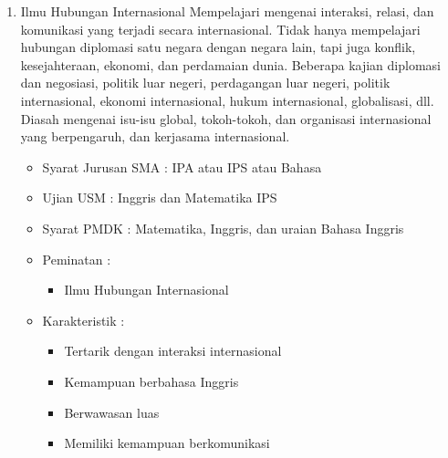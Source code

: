 \documentclass[a4paper,twoside]{article}
\begin{document}
\begin{enumerate}
\begin{enumerate}
\begin{enumerate}
				\item Ilmu Hubungan Internasional
					Mempelajari mengenai interaksi, relasi, dan komunikasi yang terjadi secara internasional. Tidak hanya mempelajari hubungan diplomasi satu negara dengan negara lain, tapi juga konflik, kesejahteraan, ekonomi, dan perdamaian dunia. Beberapa kajian diplomasi dan negosiasi, politik luar negeri, perdagangan luar negeri, politik internasional, ekonomi internasional, hukum internasional, globalisasi, dll. Diasah mengenai isu-isu global, tokoh-tokoh, dan organisasi internasional yang berpengaruh, dan kerjasama internasional.
					\begin{itemize}
						\item Syarat Jurusan SMA : IPA atau IPS atau Bahasa
						\item Ujian USM : Inggris dan Matematika IPS
						\item Syarat PMDK : Matematika, Inggris, dan uraian Bahasa Inggris
						\item Peminatan :
						\begin{itemize}
							\item Ilmu Hubungan Internasional
						\end{itemize}
						\item Karakteristik :
						\begin{itemize}
							\item Tertarik dengan interaksi internasional
							\item Kemampuan berbahasa Inggris
							\item Berwawasan luas
							\item Memiliki kemampuan berkomunikasi
						\end{itemize}
					\end{itemize}
			\end{enumerate}
			

\end{enumerate}
\end{enumerate}
\end{document}
